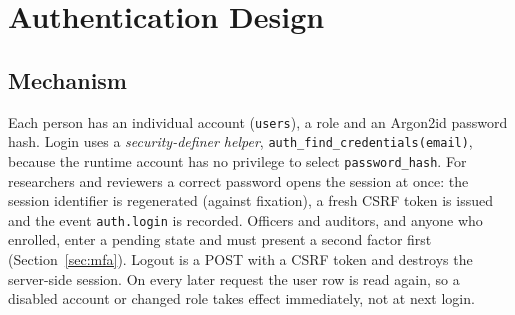 \documentclass[10pt,a4paper]{article}
\newcommand{\code}[1]{\nolinkurl{#1}}
\begin{document}
\section{Authentication Design}\label{sec:auth}

\subsection{Mechanism}
Each person has an individual account (\code{users}), a role and an Argon2id password hash. Login uses a \emph{security-definer helper}, \code{auth_find_credentials(email)}, because the runtime account has no privilege to select \code{password_hash}. For researchers and reviewers a correct password opens the session at once: the session identifier is regenerated (against fixation), a fresh CSRF token is issued and the event \code{auth.login} is recorded. Officers and auditors, and anyone who enrolled, enter a pending state and must present a second factor first (Section~\ref{sec:mfa}). Logout is a POST with a CSRF token and destroys the server-side session. On every later request the user row is read again, so a disabled account or changed role takes effect immediately, not at next login.
\end{document}
